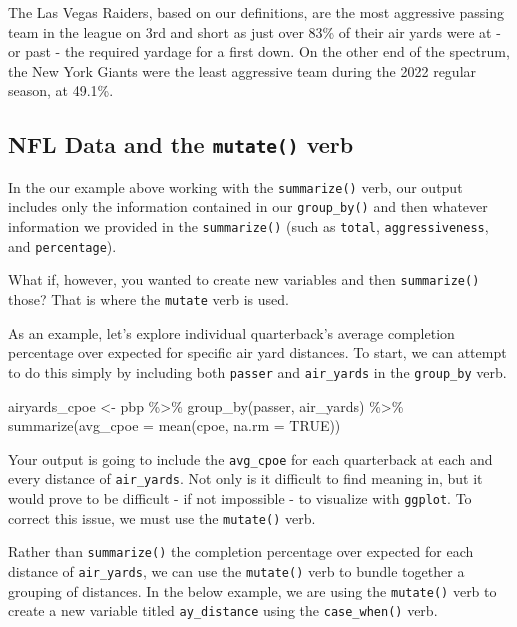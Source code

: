 \documentclass[
  letterpaper,
]{krantz}
\newenvironment{Shaded}{\begin{snugshade}}{\end{snugshade}}
\newcommand{\AttributeTok}[1]{\textcolor[rgb]{0.40,0.45,0.13}{#1}}
\newcommand{\ConstantTok}[1]{\textcolor[rgb]{0.56,0.35,0.01}{#1}}
\newcommand{\FunctionTok}[1]{\textcolor[rgb]{0.28,0.35,0.67}{#1}}
\newcommand{\NormalTok}[1]{\textcolor[rgb]{0.00,0.23,0.31}{#1}}
\newcommand{\OtherTok}[1]{\textcolor[rgb]{0.00,0.23,0.31}{#1}}
\newcommand{\SpecialCharTok}[1]{\textcolor[rgb]{0.37,0.37,0.37}{#1}}
\begin{document}
The Las Vegas Raiders, based on our definitions, are the most aggressive
passing team in the league on 3rd and short as just over 83\% of their
air yards were at - or past - the required yardage for a first down. On
the other end of the spectrum, the New York Giants were the least
aggressive team during the 2022 regular season, at 49.1\%.

\hypertarget{nfl-data-and-the-mutate-verb}{%
\subsection{\texorpdfstring{NFL Data and the \texttt{mutate()}
verb}{NFL Data and the mutate() verb}}\label{nfl-data-and-the-mutate-verb}}

In the our example above working with the \texttt{summarize()} verb, our
output includes only the information contained in our
\texttt{group\_by()} and then whatever information we provided in the
\texttt{summarize()} (such as \texttt{total}, \texttt{aggressiveness},
and \texttt{percentage}).

What if, however, you wanted to create new variables and then
\texttt{summarize()} those? That is where the \texttt{mutate} verb is
used.

As an example, let's explore individual quarterback's average completion
percentage over expected for specific air yard distances. To start, we
can attempt to do this simply by including both \texttt{passer} and
\texttt{air\_yards} in the \texttt{group\_by} verb.

\begin{Shaded}
\begin{Highlighting}[]
\NormalTok{airyards\_cpoe }\OtherTok{\textless{}{-}}\NormalTok{ pbp }\SpecialCharTok{\%\textgreater{}\%}
  \FunctionTok{group\_by}\NormalTok{(passer, air\_yards) }\SpecialCharTok{\%\textgreater{}\%}
  \FunctionTok{summarize}\NormalTok{(}\AttributeTok{avg\_cpoe =} \FunctionTok{mean}\NormalTok{(cpoe, }\AttributeTok{na.rm =} \ConstantTok{TRUE}\NormalTok{))}
\end{Highlighting}
\end{Shaded}

Your output is going to include the \texttt{avg\_cpoe} for each
quarterback at each and every distance of \texttt{air\_yards}. Not only
is it difficult to find meaning in, but it would prove to be difficult -
if not impossible - to visualize with \texttt{ggplot}. To correct this
issue, we must use the \texttt{mutate()} verb.

Rather than \texttt{summarize()} the completion percentage over expected
for each distance of \texttt{air\_yards}, we can use the
\texttt{mutate()} verb to bundle together a grouping of distances. In
the below example, we are using the \texttt{mutate()} verb to create a
new variable titled \texttt{ay\_distance} using the
\texttt{case\_when()} verb.
\end{document}
